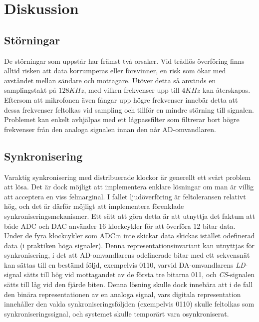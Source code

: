 \documentclass[a4paper,10pt]{article}
\begin{document}
\section{Diskussion}
\subsection{Störningar}
De störningar som uppstår har främst två orsaker. Vid trådlös överföring finns 
alltid risken att data korrumperas eller försvinner, en risk som ökar med 
avståndet mellan sändare och mottagare. Utöver detta så används en samplingstakt 
på $128 KHz$, med vilken frekvenser upp till $4 KHz$ kan återskapas. Eftersom 
att mikrofonen även fångar upp högre frekvenser innebär detta att dessa 
frekvenser feltolkas vid sampling och tillför en mindre störning till signalen. 
Problemet kan enkelt avhjälpas med ett lågpassfilter som filtrerar bort högre 
frekvenser från den analoga signalen innan den når AD-omvandlaren.

\subsection{Synkronisering}
\label{synkronisering}

Varaktig synkronisering med distribuerade klockor är generellt ett svårt problem 
att lösa. Det är dock möjligt att implementera enklare lösningar om man är
villig att acceptera en viss felmarginal. I fallet ljudöverföring är 
feltoleransen relativt hög, och det är därför möjligt att implementera 
förenklade synkroniseringsmekanismer. Ett sätt att göra detta är att utnyttja 
det faktum att både ADC och DAC använder 16 klockcykler för att överföra 12 
bitar data. Under de fyra klockcykler som ADC:n inte skickar data skickas 
istället odefinerad data (i praktiken höga signaler).
Denna representationsinvariant kan utnyttjas för
synkronisering, i det att AD-omvandlarens odefinerade bitar med ett sekvensnät kan
sättas till en bestämd följd, exempelvis 0110, varvid DA-omvandlarens \emph{LD}-signal sätts till hög vid 
mottagandet av de första tre bitarna 011, och \emph{CS}-signalen sätts till låg vid den 
fjärde biten. Denna lösning skulle dock innebära att i de fall
den binära representationen av en analoga signal, vars digitala representation  
innehåller den valda synkroniseringsföljden (exempelvis 0110) skulle feltolkas som
 synkroniseringssignal, och systemet skulle temporärt vara osynkroniserat.
\end{document}
